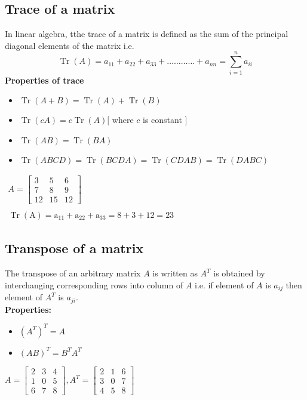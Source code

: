 \subsection{Trace of a matrix}
In linear algebra, tthe trace of a matrix is defined as the sum of the principal diagonal elements of the matrix i.e.
$$
\operatorname{Tr}({A})=a_{11}+a_{22}+a_{33}+\ldots \ldots \ldots \ldots+a_{n n}=\sum_{i=1}^{n} a_{i i}
$$
\textbf{Properties of trace}
\begin{itemize}
	\item  $\operatorname{Tr}(A+B)=\operatorname{Tr}(A)+\operatorname{Tr}(B)$
	\item $\operatorname{Tr}(c A)=c \operatorname{Tr}(A)[$ where $c$ is constant $]$
	\item $\operatorname{Tr}(A B)=\operatorname{Tr}(B A)$
	\item $\operatorname{Tr}(A B C D)=\operatorname{Tr}(B C D A)=\operatorname{Tr}(C D A B)=\operatorname{Tr}(D A B C)$
\end{itemize}
\begin{example}
	\leavevmode
	\newline
	$
	\begin{array}{l}
		A=\left[\begin{array}{rrr}
			3 & 5 & 6 \\
			7 & 8 & 9 \\
			12 & 15 & 12
		\end{array}\right] \\\\
		\operatorname{Tr}(\mathrm{A})=\mathrm{a}_{11}+\mathrm{a}_{22}+\mathrm{a}_{33}=8+3+12=23
	\end{array}
	$
\end{example}
\subsection{Transpose of a matrix}
The transpose of an arbitrary matrix $A$ is written as $A^{T}$ is obtained by interchanging corresponding rows into column of $A$ i.e. if element of $A$ is $a_{i j}$ then element of $A^{T}$ is $a_{j i}$.\\
\textbf{Properties:}
\begin{itemize}
	\item $\left(A^{T}\right)^{T}=A$
	\item $(A B)^{T}=B^{T} A^{T}$
\end{itemize}
 
\begin{example}
$
A=\left[\begin{array}{lll}
	2 & 3 & 4 \\
	1 & 0 & 5 \\
	6 & 7 & 8
\end{array}\right], A^{T}=\left[\begin{array}{lll}
	2 & 1 & 6 \\
	3 & 0 & 7 \\
	4 & 5 & 8
\end{array}\right]
$	
\end{example}
